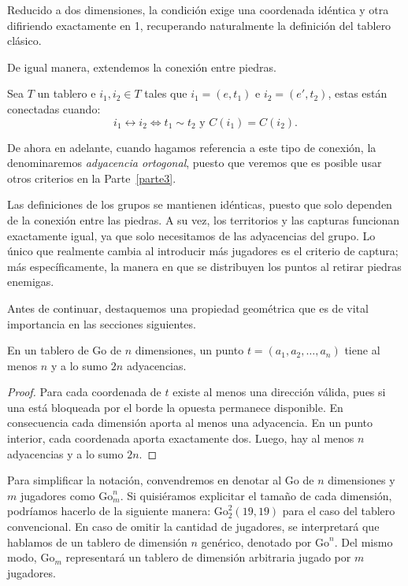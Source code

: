Reducido a dos dimensiones, la condición exige una coordenada idéntica y otra difiriendo exactamente en 1, recuperando naturalmente la definición del tablero clásico.

De igual manera, extendemos la conexión entre piedras.
\begin{definition}[Conexión]
	Sea $T$ un tablero e $i_1, i_2 \in T$ tales que $i_1 = (e, t_1)$ e $i_2 = (e', t_2)$, estas están conectadas cuando:
	\[ i_1 \leftrightarrow i_2 \iff t_1 \sim t_2 \text{ y } C(i_1) = C(i_2). \]
\end{definition}
De ahora en adelante, cuando hagamos referencia a este tipo de conexión, la denominaremos \textit{adyacencia ortogonal}, puesto que veremos que es posible usar otros criterios en la Parte~\ref{parte3}.

Las definiciones de los grupos se mantienen idénticas, puesto que solo dependen de la conexión entre las piedras. A su vez, los territorios y las capturas funcionan exactamente igual, ya que solo necesitamos de las adyacencias del grupo. Lo único que realmente cambia al introducir más jugadores es el criterio de captura; más específicamente, la manera en que se distribuyen los puntos al retirar piedras enemigas. 

Antes de continuar, destaquemos una propiedad geométrica que es de vital importancia en las secciones siguientes.

\begin{lemma}\label{lem:2n}
	En un tablero de Go de $n$ dimensiones, un punto $t=(a_1,a_2,\dots,a_n)$ tiene al menos $n$ y a lo sumo $2n$ adyacencias.
\end{lemma}

\begin{proof}
	Para cada coordenada de $t$ existe al menos una dirección válida, pues si una está bloqueada por el borde la opuesta permanece disponible. En consecuencia cada dimensión aporta al menos una adyacencia. En un punto interior, cada coordenada aporta exactamente dos. Luego, hay al menos $n$ adyacencias y a lo sumo $2n$.
\end{proof}
Para simplificar la notación, convendremos en denotar al Go de $n$ dimensiones y $m$ jugadores como $\mathrm{Go}^n_m$. Si quisiéramos explicitar el tamaño de cada dimensión, podríamos hacerlo de la siguiente manera: $\mathrm{Go}^2_2(19,19)$ para el caso del tablero convencional. En caso de omitir la cantidad de jugadores, se interpretará que hablamos de un tablero de dimensión $n$ genérico, denotado por $\mathrm{Go}^n$. Del mismo modo, $\mathrm{Go}_m$ representará un tablero de dimensión arbitraria jugado por $m$ jugadores.
